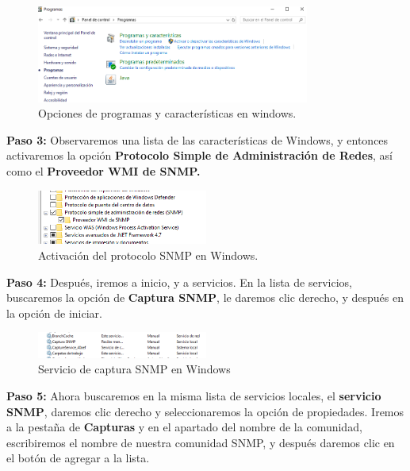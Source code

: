 \begin{figure}[htbp!]
	\centering
		\includegraphics[width=0.8\textwidth]{images/desarrollo/configuracion_windows2.png}
	\caption{Opciones de programas y características en windows.}
\end{figure} 

\noindent
\textbf{Paso 3:} Observaremos una lista de las características de Windows, y entonces activaremos la opción \textbf{Protocolo Simple de Administración de Redes}, así como el \textbf{Proveedor WMI de SNMP.}

\begin{figure}[htbp!]
	\centering
		\includegraphics[width=0.5\textwidth]{images/desarrollo/configuracion_windows3.png}
	\caption{Activación del protocolo SNMP en Windows.}
\end{figure} 

\pagebreak
\noindent
\textbf{Paso 4:} Después, iremos a inicio, y a servicios. En la lista de servicios, buscaremos la opción de \textbf{Captura SNMP}, le daremos clic derecho, y después en la opción de iniciar. 

\begin{figure}[htbp!]
	\centering
		\includegraphics[width=0.5\textwidth]{images/desarrollo/configuracion_windows4.png}
	\caption{Servicio de captura SNMP en Windows}
\end{figure} 

\pagebreak
\noindent
\textbf{Paso 5:} Ahora buscaremos en la misma lista de servicios locales, el \textbf{servicio SNMP}, daremos clic derecho y seleccionaremos la opción de propiedades.
Iremos a la pestaña de \textbf{Capturas} y en el apartado del nombre de la comunidad, escribiremos el nombre de nuestra comunidad SNMP, y después daremos clic en el botón de agregar a la lista.


